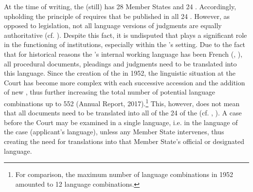\documentclass[output=paper]{langsci/langscibook}
\begin{document}
At the time of writing, the  (still) has 28 Member States and 24 . Accordingly, upholding the principle of  requires that   be published in all 24 . However, as opposed to legislation, not all language versions of judgments are equally authoritative (cf. \citealt[69]{Kjær2007}). Despite this fact, it is undisputed that  plays a significant role in the functioning of  institutions, especially within the ’s setting. Due to the fact that for historical reasons the ’s internal working language has been French (\citealt[487]{McAuliffe2013a}, \citeyear[865]{McAuliffe2013b}), all procedural documents, pleadings and judgments need to be translated into this language. Since the creation of the  in 1952, the linguistic situation at the Court has become more complex with each successive accession and the addition of new , thus further increasing the total number of potential language combinations up to 552 (Annual Report, 2017).\footnote{For comparison, the maximum number of language combinations in 1952 amounted to 12 language combinations.} This, however, does not mean that all documents need to be translated into all of the 24  of the  (cf. \citealt{McAuliffe2012}, \citealt[250]{Künnecke2013}). A case before the Court may be examined in a single language, i.e. in the language of the case (applicant’s language), unless any Member State intervenes, thus creating the need for translations into that Member State’s official or designated language.
\end{document}
